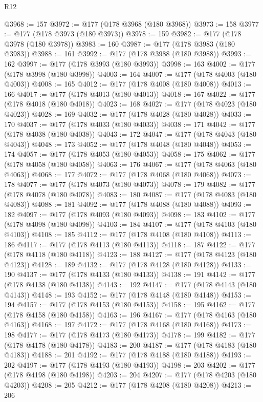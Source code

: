 \begin{lexlean}{R12}
\begin{coremodule}
{{{{{{{{{{{{{{{{{{{{{{{{{{{{{{{{{{{{{{{{{{{{{{{{{{{{{{{{{{{{{{{{{{{{{{{{{{{{{{{{{{@3968 := 157
@3972 := @177 (@178 @3968 (@180 @3968))
@3973 := 158
@3977 := @177 (@178 @3973 (@180 @3973))
@3978 := 159
@3982 := @177 (@178 @3978 (@180 @3978))
@3983 := 160
@3987 := @177 (@178 @3983 (@180 @3983))
@3988 := 161
@3992 := @177 (@178 @3988 (@180 @3988))
@3993 := 162
@3997 := @177 (@178 @3993 (@180 @3993))
@3998 := 163
@4002 := @177 (@178 @3998 (@180 @3998))
@4003 := 164
@4007 := @177 (@178 @4003 (@180 @4003))
@4008 := 165
@4012 := @177 (@178 @4008 (@180 @4008))
@4013 := 166
@4017 := @177 (@178 @4013 (@180 @4013))
@4018 := 167
@4022 := @177 (@178 @4018 (@180 @4018))
@4023 := 168
@4027 := @177 (@178 @4023 (@180 @4023))
@4028 := 169
@4032 := @177 (@178 @4028 (@180 @4028))
@4033 := 170
@4037 := @177 (@178 @4033 (@180 @4033))
@4038 := 171
@4042 := @177 (@178 @4038 (@180 @4038))
@4043 := 172
@4047 := @177 (@178 @4043 (@180 @4043))
@4048 := 173
@4052 := @177 (@178 @4048 (@180 @4048))
@4053 := 174
@4057 := @177 (@178 @4053 (@180 @4053))
@4058 := 175
@4062 := @177 (@178 @4058 (@180 @4058))
@4063 := 176
@4067 := @177 (@178 @4063 (@180 @4063))
@4068 := 177
@4072 := @177 (@178 @4068 (@180 @4068))
@4073 := 178
@4077 := @177 (@178 @4073 (@180 @4073))
@4078 := 179
@4082 := @177 (@178 @4078 (@180 @4078))
@4083 := 180
@4087 := @177 (@178 @4083 (@180 @4083))
@4088 := 181
@4092 := @177 (@178 @4088 (@180 @4088))
@4093 := 182
@4097 := @177 (@178 @4093 (@180 @4093))
@4098 := 183
@4102 := @177 (@178 @4098 (@180 @4098))
@4103 := 184
@4107 := @177 (@178 @4103 (@180 @4103))
@4108 := 185
@4112 := @177 (@178 @4108 (@180 @4108))
@4113 := 186
@4117 := @177 (@178 @4113 (@180 @4113))
@4118 := 187
@4122 := @177 (@178 @4118 (@180 @4118))
@4123 := 188
@4127 := @177 (@178 @4123 (@180 @4123))
@4128 := 189
@4132 := @177 (@178 @4128 (@180 @4128))
@4133 := 190
@4137 := @177 (@178 @4133 (@180 @4133))
@4138 := 191
@4142 := @177 (@178 @4138 (@180 @4138))
@4143 := 192
@4147 := @177 (@178 @4143 (@180 @4143))
@4148 := 193
@4152 := @177 (@178 @4148 (@180 @4148))
@4153 := 194
@4157 := @177 (@178 @4153 (@180 @4153))
@4158 := 195
@4162 := @177 (@178 @4158 (@180 @4158))
@4163 := 196
@4167 := @177 (@178 @4163 (@180 @4163))
@4168 := 197
@4172 := @177 (@178 @4168 (@180 @4168))
@4173 := 198
@4177 := @177 (@178 @4173 (@180 @4173))
@4178 := 199
@4182 := @177 (@178 @4178 (@180 @4178))
@4183 := 200
@4187 := @177 (@178 @4183 (@180 @4183))
@4188 := 201
@4192 := @177 (@178 @4188 (@180 @4188))
@4193 := 202
@4197 := @177 (@178 @4193 (@180 @4193))
@4198 := 203
@4202 := @177 (@178 @4198 (@180 @4198))
@4203 := 204
@4207 := @177 (@178 @4203 (@180 @4203))
@4208 := 205
@4212 := @177 (@178 @4208 (@180 @4208))
@4213 := 206
}}}}}}}}}}}}}}}}}}}}}}}}}}}}}}}}}}}}}}}}}}}}}}}}}}}}}}}}}}}}}}}}}}}}}}}}}}}}}}}}}}
\end{coremodule}
\end{lexlean}
